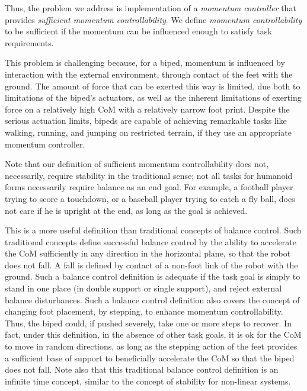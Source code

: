 \documentclass{llncs}
\begin{document}
Thus, the problem we address is implementation of a \textit{momentum controller} that provides 
\textit{sufficient momentum controllability}.
We define \textit{momentum controllability} to be sufficient if the momentum can be influenced 
enough to satisfy task requirements.


This problem is challenging because, for a biped, momentum is influenced by interaction with the external environment,
through contact of the feet with the ground.
The amount of force that can be exerted this way is limited, due both to limitations of the biped's actuators, 
as well as the inherent limitations of exerting force on a relatively high CoM with a relatively narrow foot print.
Despite the serious actuation limits, bipeds are capable of achieving remarkable tasks like walking, running, and
jumping on restricted terrain, if they use an appropriate momentum controller.

Note that our definition of sufficient momentum controllability does not, necessarily, require stability in the 
traditional sense;
not all tasks for humanoid forms necessarily require balance as an end goal. 
For example, a football player trying to score a touchdown, or a baseball player trying to catch a fly ball,
does not care if he is upright at the end, as long as the goal is achieved.

This is a more useful definition than traditional concepts of balance control.
Such traditional concepts define successful balance control by the ability to 
accelerate the CoM sufficiently in any direction in the horizontal plane, so that the robot does not fall.
A fall is defined by contact of a non-foot link of the robot with the ground.
Such a balance control definition is adequate if the task goal is simply to stand in one place
(in double support or single support), and reject external balance disturbances.
Such a balance control definition also covers the concept of changing foot placement, by stepping,
to enhance momentum controllability.
Thus, the biped could, if pushed severely, take one or more steps to recover.
In fact, under this definition, in the absence of other task goals, it is ok for the CoM to move in random 
directions, as long as the stepping action of the feet provides a sufficient base of support to
beneficially accelerate the CoM so that the biped does not fall.
Note also that this traditional balance control definition is an infinite time concept, similar to the concept of 
stability for non-linear systems.
\end{document}
